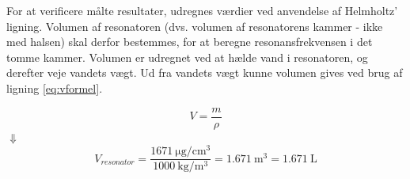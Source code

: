 For at verificere målte resultater, udregnes værdier ved anvendelse af Helmholtz' ligning. Volumen af resonatoren (dvs. volumen af resonatorens kammer - ikke med halsen) skal derfor bestemmes, for at beregne resonansfrekvensen i det tomme kammer. Volumen er udregnet ved at hælde vand i resonatoren, og derefter veje vandets vægt. Ud fra vandets vægt kunne volumen gives ved brug af ligning \ref{eq:vformel}.  

\begin{equation}
  V=\frac{m}{\rho}
  \label{eq:vformel}
\end{equation}
$\Downarrow$
\begin{equation}
V_{resonator}=\frac{\SI{1671}{\micro\gram \per \centi\meter^{3}}}{\SI{1000}{\kilo \gram \per \meter^{3}}}={\SI{1.671}{\meter^{3}}}={\SI{1.671}{\liter}}
\end{equation}

